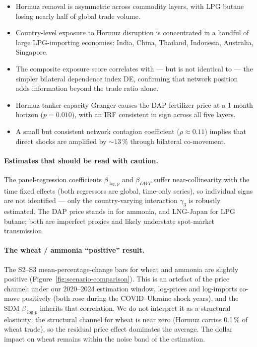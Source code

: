 \documentclass[11pt,a4paper]{article}
\begin{document}
\begin{itemize}[leftmargin=1.4em, itemsep=0.1em]
  \item Hormuz removal is asymmetric across commodity layers, with
        LPG butane losing nearly half of global trade volume.
  \item Country-level exposure to Hormuz disruption is concentrated
        in a handful of large LPG-importing economies: India, China,
        Thailand, Indonesia, Australia, Singapore.
  \item The composite exposure score correlates with --- but is not
        identical to --- the simpler bilateral dependence index DE,
        confirming that network position adds information beyond
        the trade ratio alone.
  \item Hormuz tanker capacity Granger-causes the DAP fertilizer
        price at a 1-month horizon ($p = 0.010$), with an IRF
        consistent in sign across all five layers.
  \item A small but consistent network contagion coefficient
        ($\rho \approx 0.11$) implies that direct shocks are
        amplified by $\sim\!13\,\%$ through bilateral co-movement.
\end{itemize}

\paragraph{Estimates that should be read with caution.}
The panel-regression coefficients $\beta_{\log p}$ and $\beta_{DWT}$
suffer near-collinearity with the time fixed effects (both regressors
are global, time-only series), so individual signs are not
identified --- only the country-varying interaction $\gamma_3$ is
robustly estimated. The DAP price stands in for ammonia, and
LNG-Japan for LPG butane; both are imperfect proxies and likely
understate spot-market transmission.

\paragraph{The wheat / ammonia ``positive'' result.}
The S2--S3 mean-percentage-change bars for wheat and ammonia are
slightly positive (Figure~\ref{fig:scenario-comparison}). This is an
artefact of the price channel: under our 2020--2024 estimation
window, log-prices and log-imports co-move positively (both rose
during the COVID--Ukraine shock years), and the SDM
$\beta_{\log p}$ inherits that correlation. We do not interpret it
as a structural elasticity; the structural channel for wheat is
near zero (Hormuz carries 0.1\,\% of wheat trade), so the residual
price effect dominates the average. The dollar impact on wheat
remains within the noise band of the estimation.
\end{document}
